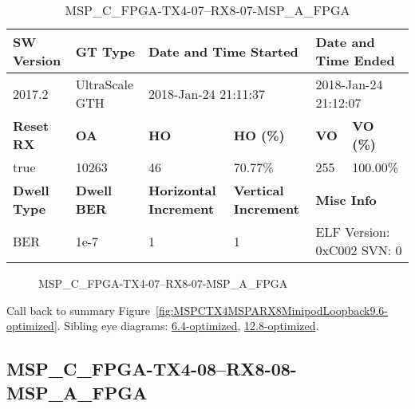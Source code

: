 \begin{table}[h]
\centering
\caption{MSP\_C\_FPGA-TX4-07--RX8-07-MSP\_A\_FPGA}
\label{tab:MSPCFPGATX407RX807MSPAFPGA9.6-optimized}
\begin{tabular}{@{}|l|l|l|l|l|l|@{}}
\toprule
\textbf{SW Version}                & \textbf{GT Type}   & \multicolumn{2}{l|}{\textbf{Date and Time Started}}            & \multicolumn{2}{l|}{\textbf{Date and Time Ended}}        \\ \midrule
2017.2                       & UltraScale GTH          & \multicolumn{2}{l|}{2018-Jan-24 21:11:37}                   & \multicolumn{2}{l|}{2018-Jan-24 21:12:07}               \\ \midrule
\textbf{Reset RX}                  & \textbf{OA} & \textbf{HO}   & \textbf{HO (\%)} & \textbf{VO} & \textbf{VO (\%)} \\ \midrule
true & 10263        & 46          & 70.77\%        & 255        & 100.00\%       \\ \midrule
\textbf{Dwell Type}                & \textbf{Dwell BER} & \textbf{Horizontal Increment} & \textbf{Vertical Increment}    & \multicolumn{2}{l|}{\textbf{Misc Info}}                  \\ \midrule
BER                            & 1e-7        & 1        & 1           & \multicolumn{2}{l|}{ELF Version: 0xC002 SVN: 0}                         \\ \bottomrule
\end{tabular}
\end{table}

\begin{figure}[h]
\caption{MSP\_C\_FPGA-TX4-07--RX8-07-MSP\_A\_FPGA} \label{fig:MSPCFPGATX407RX807MSPAFPGA9.6-optimized}
\end{figure}

Call back to summary Figure~\ref{fig:MSPCTX4MSPARX8MinipodLoopback9.6-optimized}.
Sibling eye diagrams: \hyperref[sec:MSPCFPGATX407RX807MSPAFPGA6.4-optimized]{6.4-optimized}, \hyperref[sec:MSPCFPGATX407RX807MSPAFPGA12.8-optimized]{12.8-optimized}.

\clearpage
\newpage


\subsection{MSP\_C\_FPGA-TX4-08--RX8-08-MSP\_A\_FPGA}\label{sec:MSPCFPGATX408RX808MSPAFPGA9.6-optimized}

